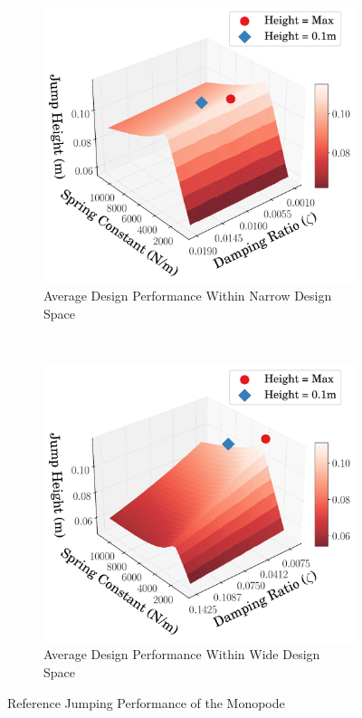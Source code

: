 \begin{figure}[tb!]
        \centering
        \begin{subfigure}{0.75\textwidth}
        \centering
        \includegraphics[width=\linewidth]{figures/Ch4/design_space_narr/3D_Plot_0.01_.pdf}
        \caption{Average Design Performance Within Narrow Design Space}
        \label{fig:des_performance_wide}
        \end{subfigure} \\
        \begin{subfigure}{0.75\textwidth}
        \centering
        \includegraphics[width=\linewidth]{figures/Ch4/design_space_wide/3D_Plot_0.075_.pdf}
        \caption{Average Design Performance Within Wide Design Space}
        \label{fig:des_performance_narrow}
        \end{subfigure} 
         \caption{Reference Jumping Performance of the Monopode}
         \label{fig:des_performance}
\end{figure}

